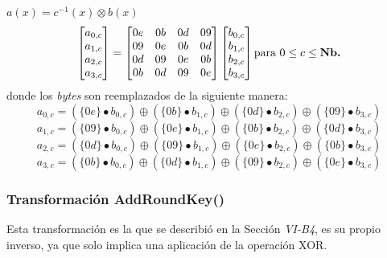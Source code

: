 \documentclass[peerreview]{IEEEtran}
\begin{document}
 $a(x)=c^{-1}(x) \otimes b(x)$
\[ \begin{bmatrix}
	a_{0, c}\\
	a_{1, c}\\
	a_{2, c}\\
	a_{3, c}\\
\end{bmatrix} = \begin{bmatrix}
	0e & 0b & 0d & 09 \\
	09 & 0e & 0b & 0d \\
	0d & 09 & 0e & 0b \\
	0b & 0d & 09 & 0e 
\end{bmatrix} \begin{bmatrix}
	b_{0, c}\\
	b_{1, c}\\
	b_{2, c}\\
	b_{3, c}\\
\end{bmatrix} \text{para } 0 \leq c \leq \text{\textbf{Nb.}}\] donde los \textit{bytes} son reemplazados de la siguiente manera: 
\[a_{0, c}=(\{0e\}\bullet b_{0, c}) \oplus (\{0b\}\bullet b_{1, c}) \oplus (\{0d\}\bullet b_{2, c}) \oplus (\{09\}\bullet b_{3, c})\]
\[a_{1, c}=(\{09\}\bullet b_{0, c}) \oplus (\{0e\}\bullet b_{1, c}) \oplus (\{0b\}\bullet b_{2, c}) \oplus (\{0d\}\bullet b_{3, c})\]
\[a_{2, c}=(\{0d\}\bullet b_{0, c}) \oplus (\{09\}\bullet b_{1, c}) \oplus (\{0e\}\bullet b_{2, c}) \oplus (\{0b\}\bullet b_{3, c})\]
\[a_{3, c}=(\{0b\}\bullet b_{0, c}) \oplus (\{0d\}\bullet b_{1, c}) \oplus (\{09\}\bullet b_{2, c}) \oplus (\{0e\}\bullet b_{3, c})\]

\subsubsection{Transformación AddRoundKey()} Esta transformación es la  que se describió en la Sección \textit{VI-B4}, es su propio inverso, ya que solo implica una aplicación de la operación XOR.\\
\end{document}
